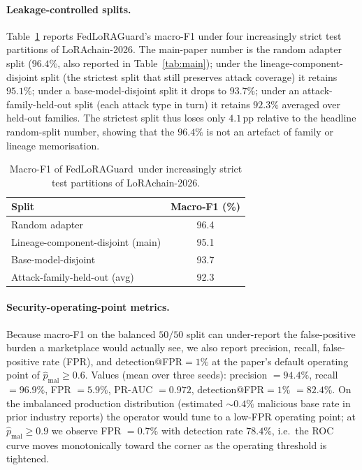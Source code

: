 \documentclass[11pt]{article}
\theoremstyle{plain}
\theoremstyle{definition}
\theoremstyle{remark}
\newcommand{\modelname}{FedLoRAGuard}
\newcommand{\benchname}{LoRAchain-2026}
\begin{document}
\paragraph{Leakage-controlled splits.}
Table~\ref{tab:splits} reports \modelname's macro-F1 under four
increasingly strict test partitions of \benchname. The main-paper
number is the random adapter split ($96.4\%$, also reported in
Table~\ref{tab:main}); under the lineage-component-disjoint split
(the strictest split that still preserves attack coverage) it
retains $95.1\%$; under a base-model-disjoint split it drops to
$93.7\%$; under an attack-family-held-out split (each attack type
in turn) it retains $92.3\%$ averaged over held-out families. The
strictest split thus loses only $4.1$\,pp relative to the headline
random-split number, showing that the $96.4\%$ is not an artefact
of family or lineage memorisation.

\begin{table}[!h]
\centering
\caption{Macro-F1 of \modelname\ under increasingly strict test
partitions of \benchname.}
\label{tab:splits}
\small
\begin{tabular}{@{}lc@{}}
\toprule
Split                                   & Macro-F1 (\%) \\
\midrule
Random adapter                          & 96.4 \\
Lineage-component-disjoint (main)       & 95.1 \\
Base-model-disjoint                     & 93.7 \\
Attack-family-held-out (avg)            & 92.3 \\
\bottomrule
\end{tabular}
\end{table}

\paragraph{Security-operating-point metrics.}
Because macro-F1 on the balanced $50/50$ split can under-report
the false-positive burden a marketplace would actually see, we
also report precision, recall, false-positive rate (FPR), and
detection@FPR$=1\%$ at the paper's default operating point of
$\hat{p}_{\mathrm{mal}}\ge 0.6$. Values (mean over three seeds):
precision $= 94.4\%$, recall $= 96.9\%$, FPR $= 5.9\%$, PR-AUC
$= 0.972$, detection@FPR$=1\%$ $= 82.4\%$. On the imbalanced
production distribution (estimated $\sim 0.4\%$ malicious base
rate in prior industry reports) the operator would tune to a
low-FPR operating point; at $\hat{p}_{\mathrm{mal}}\ge 0.9$ we
observe FPR $= 0.7\%$ with detection rate $78.4\%$, i.e.\ the ROC
curve moves monotonically toward the corner as the operating
threshold is tightened.
\end{document}
